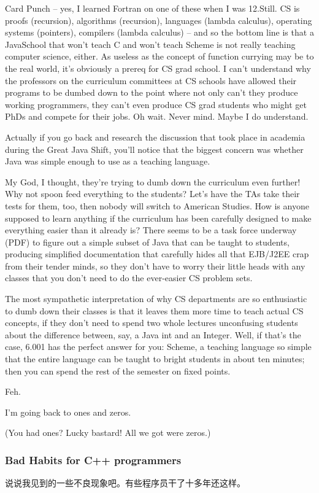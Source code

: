 \documentclass[11pt]{article}
\begin{document}
Card Punch -- yes, I learned Fortran on one of these when I was 12.Still. CS is
proofs (recursion), algorithms (recursion), languages (lambda calculus),
operating systems (pointers), compilers (lambda calculus) -- and so the bottom
line is that a JavaSchool that won't teach C and won't teach Scheme is not
really teaching computer science, either. As useless as the concept of function
currying may be to the real world, it's obviously a prereq for CS grad school. I
can't understand why the professors on the curriculum committees at CS schools
have allowed their programs to be dumbed down to the point where not only can't
they produce working programmers, they can't even produce CS grad students who
might get PhDs and compete for their jobs. Oh wait. Never mind. Maybe I do
understand.

Actually if you go back and research the discussion that took place in academia
during the Great Java Shift, you'll notice that the biggest concern was whether
Java was simple enough to use as a teaching language.

My God, I thought, they're trying to dumb down the curriculum even further! Why
not spoon feed everything to the students? Let's have the TAs take their tests
for them, too, then nobody will switch to American Studies. How is anyone
supposed to learn anything if the curriculum has been carefully designed to make
everything easier than it already is? There seems to be a task force underway
(PDF) to figure out a simple subset of Java that can be taught to students,
producing simplified documentation that carefully hides all that EJB/J2EE crap
from their tender minds, so they don't have to worry their little heads with any
classes that you don't need to do the ever-easier CS problem sets.

The most sympathetic interpretation of why CS departments are so enthusiastic to
dumb down their classes is that it leaves them more time to teach actual CS
concepts, if they don't need to spend two whole lectures unconfusing students
about the difference between, say, a Java int and an Integer. Well, if that's
the case, 6.001 has the perfect answer for you: Scheme, a teaching language so
simple that the entire language can be taught to bright students in about ten
minutes; then you can spend the rest of the semester on fixed points.

Feh.

I'm going back to ones and zeros.

(You had ones? Lucky bastard! All we got were zeros.)
\subsubsection*{Bad Habits for C++ programmers}
\label{sec:orgheadline153}
说说我见到的一些不良现象吧。有些程序员干了十多年还这样。
\end{document}
